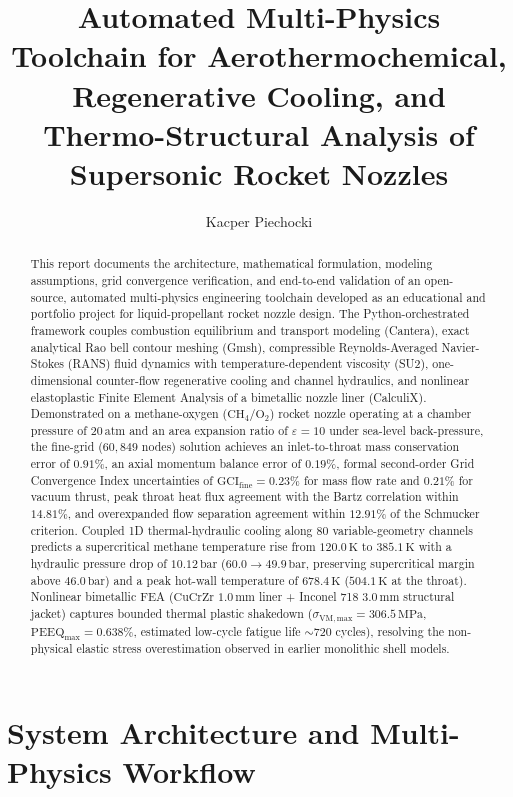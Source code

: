 \documentclass[11pt,a4paper]{article}
\title{\textbf{Automated Multi-Physics Toolchain for Aerothermochemical, Regenerative Cooling, and Thermo-Structural Analysis of Supersonic Rocket Nozzles}}
\author{Kacper Piechocki}
\date{}
\begin{document}
\maketitle

\begin{abstract}
This report documents the architecture, mathematical formulation, modeling assumptions, grid convergence verification, and end-to-end validation of an open-source, automated multi-physics engineering toolchain developed as an educational and portfolio project for liquid-propellant rocket nozzle design. The Python-orchestrated framework couples combustion equilibrium and transport modeling (Cantera), exact analytical Rao bell contour meshing (Gmsh), compressible Reynolds-Averaged Navier-Stokes (RANS) fluid dynamics with temperature-dependent viscosity (SU2), one-dimensional counter-flow regenerative cooling and channel hydraulics, and nonlinear elastoplastic Finite Element Analysis of a bimetallic nozzle liner (CalculiX). Demonstrated on a methane-oxygen ($\mathrm{CH_4/O_2}$) rocket nozzle operating at a chamber pressure of $20\,\mathrm{atm}$ and an area expansion ratio of $\varepsilon = 10$ under sea-level back-pressure, the fine-grid ($60{,}849$ nodes) solution achieves an inlet-to-throat mass conservation error of $0.91\%$, an axial momentum balance error of $0.19\%$, formal second-order Grid Convergence Index uncertainties of $\mathrm{GCI}_{\mathrm{fine}} = 0.23\%$ for mass flow rate and $0.21\%$ for vacuum thrust, peak throat heat flux agreement with the Bartz correlation within $14.81\%$, and overexpanded flow separation agreement within $12.91\%$ of the Schmucker criterion. Coupled 1D thermal-hydraulic cooling along $80$ variable-geometry channels predicts a supercritical methane temperature rise from $120.0\,\mathrm{K}$ to $385.1\,\mathrm{K}$ with a hydraulic pressure drop of $10.12\,\mathrm{bar}$ ($60.0 \to 49.9\,\mathrm{bar}$, preserving supercritical margin above $46.0\,\mathrm{bar}$) and a peak hot-wall temperature of $678.4\,\mathrm{K}$ ($504.1\,\mathrm{K}$ at the throat). Nonlinear bimetallic FEA ($\mathrm{CuCrZr}$ $1.0\,\mathrm{mm}$ liner + Inconel 718 $3.0\,\mathrm{mm}$ structural jacket) captures bounded thermal plastic shakedown ($\sigma_{\mathrm{VM,max}} = 306.5\,\mathrm{MPa}$, $\mathrm{PEEQ}_{\max} = 0.638\%$, estimated low-cycle fatigue life $\sim 720$ cycles), resolving the non-physical elastic stress overestimation observed in earlier monolithic shell models.
\end{abstract}

\section{System Architecture and Multi-Physics Workflow}
\end{document}
